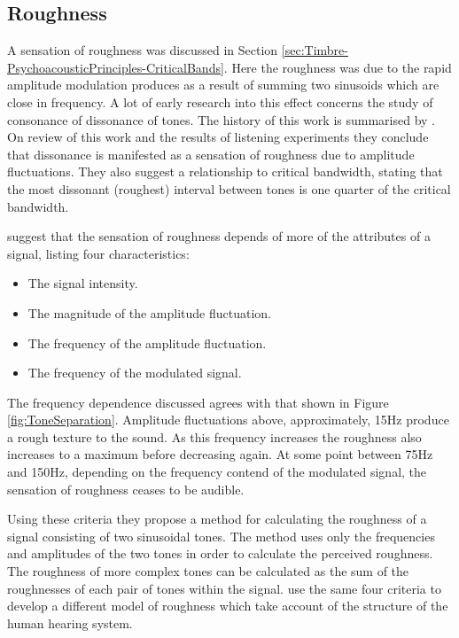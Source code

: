 	\subsection{Roughness}
	\label{sec:Timbre-TimbralFeatures-Roughness}
		A sensation of roughness was discussed in Section \ref{sec:Timbre-PsychoacousticPrinciples-CriticalBands}.
		Here the roughness was due to the rapid amplitude modulation produces as a result of summing two sinusoids
		which are close in frequency. A lot of early research into this effect concerns the study of consonance of
		dissonance of tones. The history of this work is summarised by \citet{plomp1965tonal}. On review of this
		work and the results of listening experiments they conclude that dissonance is manifested as a sensation of
		roughness due to amplitude fluctuations.  They also suggest a relationship to critical bandwidth, stating
		that the most dissonant (roughest) interval between tones is one quarter of the critical bandwidth.

		\citet{vassilakis2010psychoacoustic} suggest that the sensation of roughness depends of more of the
		attributes of a signal, listing four characteristics:

		\begin{itemize}
			\item The signal intensity.
			\item The magnitude of the amplitude fluctuation.
			\item The frequency of the amplitude fluctuation.
			\item The frequency of the modulated signal.
		\end{itemize}

		The frequency dependence discussed agrees with that shown in Figure \ref{fig:ToneSeparation}. Amplitude
		fluctuations above, approximately, 15Hz produce a rough texture to the sound. As this frequency increases
		the roughness also increases to a maximum before decreasing again. At some point between 75Hz and 150Hz,
		depending on the frequency contend of the modulated signal, the sensation of roughness ceases to be audible.

		Using these criteria they propose a method for calculating the roughness of a signal consisting of two
		sinusoidal tones. The method uses only the frequencies and amplitudes of the two tones in order to calculate
		the perceived roughness. The roughness of more complex tones can be calculated as the sum of the roughnesses
		of each pair of tones within the signal. \citet{fastl2007psychoacoustics} use the same four criteria to
		develop a different model of roughness which take account of the structure of the human hearing system.

